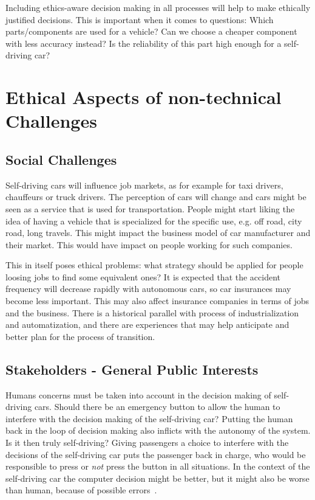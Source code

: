 Including ethics-aware decision making in all processes will help to make ethically justified decisions. This is important when it comes to questions: Which parts/components are used for a vehicle? Can we choose a cheaper component with less accuracy instead? Is the reliability of this part high enough for a self-driving car?



\section{Ethical Aspects of non-technical Challenges}
\label{sec:EAofNONTC}

\subsection{Social Challenges}
\label{sec:EAofNONTC:SocialChallenges}

Self-driving cars will influence job markets, as for example for taxi drivers, chauffeurs or truck drivers. The perception of cars will change and cars might be seen as a service that is used for transportation. People might start liking the idea of having a vehicle that is specialized for the specific use, e.g. off road, city road, long travels. This might impact the business model of car manufacturer and their market. This would have impact on people working for such companies.

This in itself poses ethical problems: what strategy should be applied for people loosing jobs to find some equivalent ones? It is expected that the accident frequency will decrease rapidly with autonomous cars, so car insurances may become less important. This may also affect insurance companies in terms of jobs and the business. There is a historical parallel with process of industrialization and automatization, and there are experiences that may help anticipate and better plan for the process of transition.


\subsection{Stakeholders - General Public Interests}
\label{sec:EAofNONTC:Stakeholders}

Humans concerns must be taken into account in the decision making of self-driving cars. %
Should there be an emergency button to allow the human to interfere with the decision making of the self-driving car? %
Putting the human back in the loop of decision making also inflicts with the autonomy of the system. Is it then truly self-driving? Giving passengers a choice to interfere with the decisions of the self-driving car puts the passenger back in charge, who would be responsible to press or \textit{not} press the button in all situations. %
In the context of the self-driving car the computer decision might be better, but it might also be worse than human, because of possible errors~\cite{Eckstein2016}.

